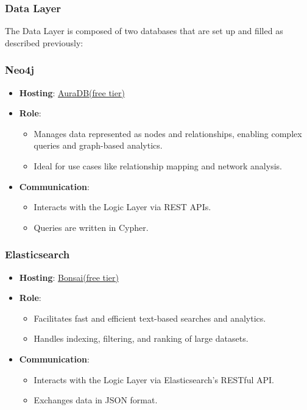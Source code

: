 \subsubsection{Data Layer}

The Data Layer is composed of two databases that are set up and filled as described previously:

\subsubsection{Neo4j}
\begin{itemize}
\item \textbf{Hosting}: \href{https://neo4j.com/product/auradb/}{AuraDB(free tier)}
\item \textbf{Role}:
\begin{itemize}
\item Manages data represented as nodes and relationships, enabling complex queries and graph-based analytics.
\item Ideal for use cases like relationship mapping and network analysis.
\end{itemize}
\item \textbf{Communication}:
\begin{itemize}
\item Interacts with the Logic Layer via REST APIs.
\item Queries are written in Cypher.
\end{itemize}
\end{itemize}

\subsubsection{Elasticsearch}
\begin{itemize}
\item \textbf{Hosting}: \href{https://bonsai.io/}{Bonsai(free tier)}
\item \textbf{Role}:
\begin{itemize}
\item Facilitates fast and efficient text-based searches and analytics.
\item Handles indexing, filtering, and ranking of large datasets.
\end{itemize}
\item \textbf{Communication}:
\begin{itemize}
\item Interacts with the Logic Layer via Elasticsearch's RESTful API.
\item Exchanges data in JSON format.
\end{itemize}
\end{itemize}

